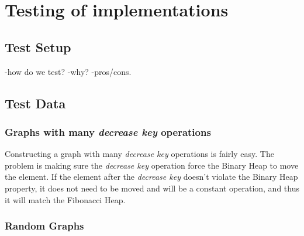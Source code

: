 \section*{Testing of implementations}
\subsection*{Test Setup}
 -how do we test?
 -why?
 -pros/cons.

\subsection*{Test Data}
  \subsubsection*{Graphs with many \textit{decrease key} operations} 
    Constructing a graph with many \textit{decrease key} operations is fairly easy. The problem is making sure the \textit{decrease key} operation force the Binary Heap to move the element. If the element after the \textit{decrease key} doesn't violate the Binary Heap property, it does not need to be moved and will be a constant operation, and thus it will match the Fibonacci Heap.
 \subsubsection*{Random Graphs}
    
